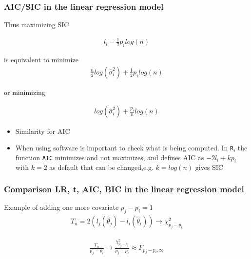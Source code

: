 \documentclass[
  shownotes,
  xcolor={svgnames},
  hyperref={colorlinks,citecolor=DarkBlue,linkcolor=DarkRed,urlcolor=DarkBlue}
  ]{beamer}
\begin{document}
\begin{frame}[fragile]
\frametitle{AIC/SIC in the linear regression model}
Thus maximizing SIC

\begin{align}
l_i - \frac{1}{2} p_i log(n)
\end{align}

is equivalent to minimize
\begin{align}
\frac{n}{2}log(\hat \sigma_i^2) + \frac{1}{2} p_i log(n)
\end{align}

or minimizing

\begin{align}
log(\hat \sigma_i^2) + \frac{p_i}{n}  log(n)
\end{align}
\begin{itemize}
  \item Similarity for AIC
  \item When using software is important to check what is being computed. In \texttt{R}, the function \texttt{AIC} minimizes and not maximizes, and defines AIC as $-2l_i+kp_i$ with $k=2$ as default that can be changed,e.g. $k=log(n)$ gives SIC
\end{itemize}

 \end{frame}
\begin{frame}[fragile]
\frametitle{Comparison LR, t, AIC, BIC in the linear regression model}

Example of adding one more covariate $p_j-p_i =1$
\begin{align}
T_n=2(l_j(\hat \theta_j)-l_i(\hat \theta_i)) \rightarrow \chi^2_{p_j-p_i}
\end{align}

\begin{align}
\frac{T_n}{p_j-p_i} \rightarrow \frac{\chi^2_{p_j-p_i}}{p_j-p_i}\approx F_{p_j-p_i,\infty}
\end{align}
 \end{frame}
\end{document}

